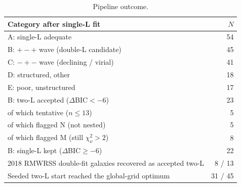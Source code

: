 \documentclass[9pt]{extarticle}
\begin{document}
\begin{table}[h]\centering\small\caption{Pipeline outcome.}\begin{tabular}{lr}\toprule Category after single-L fit & $N$\\\midrule
A: single-L adequate & 54\\
B: $+-+$ wave (double-L candidate) & 45\\
C: $-+-$ wave (declining / virial) & 41\\
D: structured, other & 18\\
E: poor, unstructured & 17\\
\midrule
B: two-L accepted ($\Delta$BIC$<-6$) & 23\\ \quad of which tentative ($n\le13$) & 5\\ \quad of which flagged N (not nested) & 5\\ \quad of which flagged M (still $\chi^2_\nu>2$) & 8\\
B: single-L kept ($\Delta$BIC$\ge-6$) & 22\\
2018 RMWRSS double-fit galaxies recovered as accepted two-L & 8 / 13\\
Seeded two-L start reached the global-grid optimum & 31 / 45\\
\bottomrule\end{tabular}\end{table}\clearpage
\end{document}
